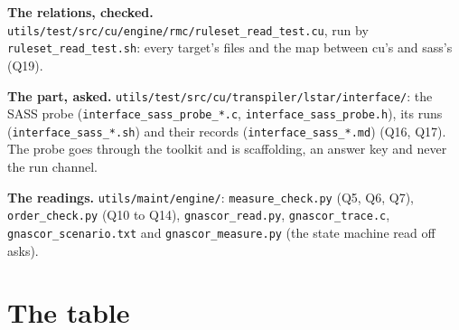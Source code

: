 \textbf{The relations, checked.} \texttt{utils/\allowbreak{}test/\allowbreak{}src/\allowbreak{}cu/\allowbreak{}engine/\allowbreak{}rmc/\allowbreak{}ruleset\_\allowbreak{}read\_\allowbreak{}test.\allowbreak{}cu}, run by \texttt{ruleset\_\allowbreak{}read\_\allowbreak{}test.\allowbreak{}sh}: every target's files and the map between cu's and sass's (Q19).

\textbf{The part, asked.} \texttt{utils/\allowbreak{}test/\allowbreak{}src/\allowbreak{}cu/\allowbreak{}transpiler/\allowbreak{}lstar/\allowbreak{}interface/\allowbreak{}}: the SASS probe (\texttt{interface\_\allowbreak{}sass\_\allowbreak{}probe\_\allowbreak{}*.\allowbreak{}c}, \texttt{interface\_\allowbreak{}sass\_\allowbreak{}probe.\allowbreak{}h}), its runs (\texttt{interface\_\allowbreak{}sass\_\allowbreak{}*.\allowbreak{}sh}) and their records (\texttt{interface\_\allowbreak{}sass\_\allowbreak{}*.\allowbreak{}md}) (Q16, Q17). The probe goes through the toolkit and is scaffolding, an answer key and never the run channel.

\textbf{The readings.} \texttt{utils/\allowbreak{}maint/\allowbreak{}engine/\allowbreak{}}: \texttt{measure\_\allowbreak{}check.\allowbreak{}py} (Q5, Q6, Q7), \texttt{order\_\allowbreak{}check.\allowbreak{}py} (Q10 to Q14), \texttt{gnascor\_\allowbreak{}read.\allowbreak{}py}, \texttt{gnascor\_\allowbreak{}trace.\allowbreak{}c}, \texttt{gnascor\_\allowbreak{}scenario.\allowbreak{}txt} and \texttt{gnascor\_\allowbreak{}measure.\allowbreak{}py} (the state machine read off asks).

\section{\texorpdfstring{The table}{The table}}

